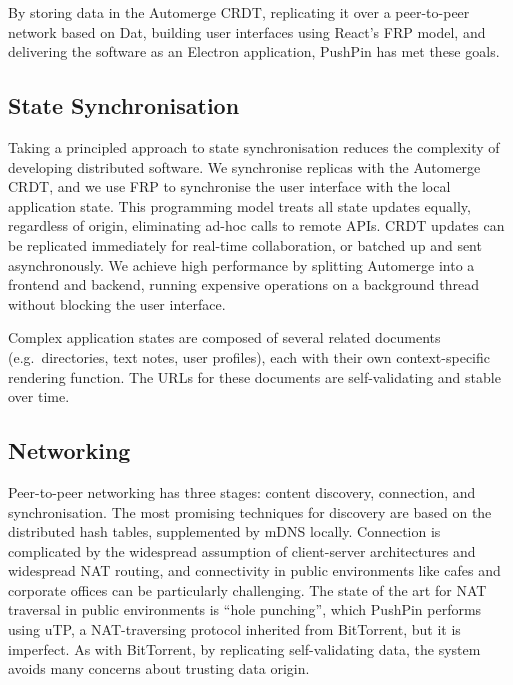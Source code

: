 \documentclass[sigplan,10pt]{acmart}
\begin{document}
By storing data in the Automerge CRDT, replicating it over a peer-to-peer network based on Dat, building user interfaces using React's FRP model, and delivering the software as an Electron application, PushPin has met these goals.

\subsection{State Synchronisation}

Taking a principled approach to state synchronisation reduces the complexity of developing distributed software. We synchronise replicas with the Automerge CRDT, and we use FRP to synchronise the user interface with the local application state. This programming model treats all state updates equally, regardless of origin, eliminating ad-hoc calls to remote APIs. CRDT updates can be replicated immediately for real-time collaboration, or batched up and sent asynchronously. We achieve high performance by splitting Automerge into a frontend and backend, running expensive operations on a background thread without blocking the user interface.

Complex application states are composed of several related documents (e.g.\ directories, text notes, user profiles), each with their own context-specific rendering function. The URLs for these documents are self-validating and stable over time.

\subsection{Networking}

Peer-to-peer networking has three stages: content discovery, connection, and synchronisation. The most promising techniques for discovery are based on the distributed hash tables, supplemented by mDNS locally. Connection is complicated by the widespread assumption of client-server architectures and widespread NAT routing, and connectivity in public environments like cafes and corporate offices can be particularly challenging.  The state of the art for NAT traversal in public environments is ``hole punching'', which PushPin performs using uTP, a NAT-traversing protocol inherited from BitTorrent, but it is imperfect. As with BitTorrent, by replicating self-validating data, the system avoids many concerns about trusting data origin.
\end{document}
